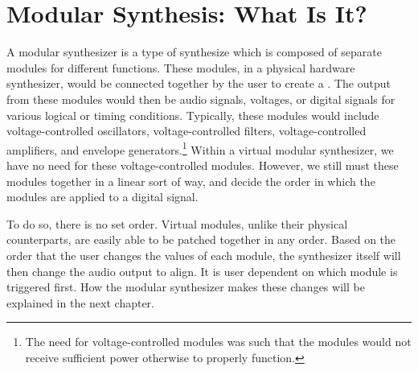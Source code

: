 \section[Modular Synthesis: What Is It?]{Modular Synthesis: What Is It?}\label{modular-synth-what-is}

A modular synthesizer is a type of synthesize which is composed of separate modules for different functions. These modules, in a physical hardware synthesizer, would be connected together by the user to create a . The output from these modules would then be audio signals, voltages, or digital signals for various logical or timing conditions. Typically, these modules would include voltage-controlled oscillators, voltage-controlled filters, voltage-controlled amplifiers, and envelope generators.\footnote{The need for voltage-controlled modules was such that the modules would not receive sufficient power otherwise to properly function.} Within a virtual modular synthesizer, we have no need for these voltage-controlled modules. However, we still must  these modules together in a linear sort of way, and decide the order in which the modules are applied to a digital signal. 

To do so, there is no set order. Virtual modules, unlike their physical counterparts, are easily able to be patched together in any order. Based on the order that the user changes the values of each module, the synthesizer itself will then change the audio output to align. It is user dependent on which module is triggered first. How the modular synthesizer makes these changes will be explained in the next chapter. 

